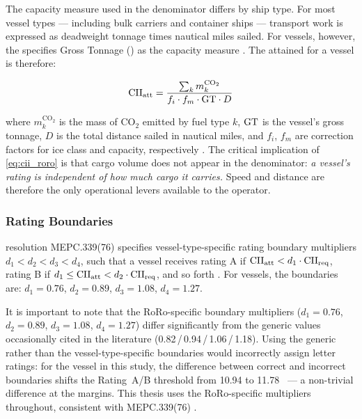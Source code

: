The capacity measure used in the \CII{} denominator differs by ship type.
For most vessel types --- including bulk carriers and container ships ---
transport work is expressed as deadweight tonnage times nautical miles
sailed. For \RoRo{} vessels, however, the \IMO{} specifies Gross Tonnage
(\GT{}) as the capacity measure \parencite{mepc336, mepc339}. The attained
\CII{} for a \RoRo{} vessel is therefore:

\begin{equation}
  \mathrm{CII}_{\mathrm{att}}
  = \frac{\sum_k m^{\mathrm{CO}_2}_k}
         {f_i \cdot f_m \cdot \mathrm{GT} \cdot D}
  \label{eq:cii_roro}
\end{equation}

\noindent where $m^{\mathrm{CO}_2}_k$ is the mass of CO$_2$ emitted by
fuel type $k$, $\mathrm{GT}{}$ is the vessel's gross tonnage, $D$ is the total
distance sailed in nautical miles, and $f_i$, $f_m$ are correction factors
for ice class and capacity, respectively \parencite{mepc336}. The critical
implication of \cref{eq:cii_roro} is that cargo volume does not appear in
the denominator: \textit{a \RoRo{} vessel's \CII{} rating is independent
of how much cargo it carries.} Speed and distance are therefore the only
operational levers available to the operator.

\subsubsection{Rating Boundaries}
\label{sec:lit:boundaries}

\IMO{} resolution MEPC.339(76) specifies vessel-type-specific rating
boundary multipliers $d_1 < d_2 < d_3 < d_4$, such that a vessel receives
rating A if $\mathrm{CII}_{\mathrm{att}} < d_1 \cdot \mathrm{CII}_{\mathrm{req}}$, rating B if
$d_1 \leq \mathrm{CII}_{\mathrm{att}} < d_2 \cdot \mathrm{CII}_{\mathrm{req}}$, and so forth
\parencite{mepc339}. For \RoRo{} vessels, the boundaries are:
$d_1 = 0.76$, $d_2 = 0.89$, $d_3 = 1.08$, $d_4 = 1.27$.

It is important to note that the RoRo-specific boundary multipliers
($d_1=0.76$, $d_2=0.89$, $d_3=1.08$, $d_4=1.27$) differ significantly from
the generic values occasionally cited in the literature
(0.82\,/\,0.94\,/\,1.06\,/\,1.18).  Using the generic rather than the
vessel-type-specific boundaries would incorrectly assign letter ratings: for
the vessel in this study, the difference between correct and incorrect
boundaries shifts the Rating~A/B threshold from 10.94 to 11.78~\gGTnm{} ---
a non-trivial difference at the margins.  This thesis uses the RoRo-specific
multipliers throughout, consistent with MEPC.339(76) \parencite{mepc339}.

